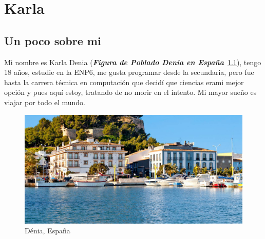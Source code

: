 \chapter{Karla}

\section{Un poco sobre mi}
Mi nombre es Karla Denia (\textbf{\emph{Figura de Poblado Denia en España}}~\ref{fig:Dénia}), tengo 18 años, estudie en la ENP6, me gusta programar desde la secundaria, pero fue hasta la carrera técnica en computación que decidí que ciencias  erami mejor opción y pues aquí estoy, tratando de no morir en el intento. Mi mayor sueño es viajar por todo el mundo.
\begin{figure}[h]
  \centering
  \includegraphics[scale=0.15]{IMG/7.jpg}
  \caption{Dénia, España}
  \label{fig:Dénia}
\end{figure}
